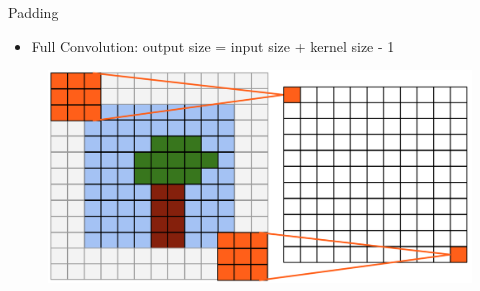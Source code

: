 \begin{frame}[allowframebreaks]{Padding}
\framebreak

\begin{itemize}
    \item Full Convolution: output size = input size + kernel size - 1
\end{itemize}


\begin{figure}
\centering
\includegraphics[width=1.0\textwidth,height=0.8\textheight,keepaspectratio]{images/cnn/pad_2.png}
\end{figure}
    
\end{frame}
